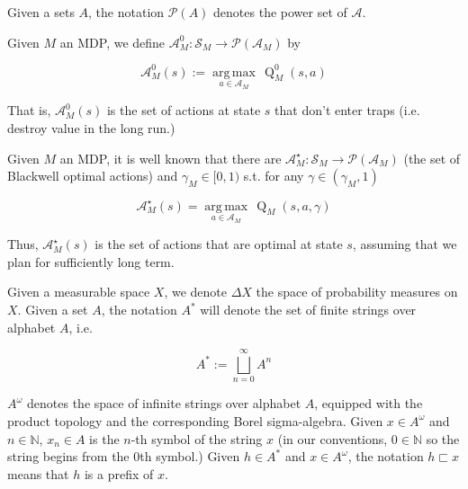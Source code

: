\documentclass[anon,12pt]{colt2018} %
\newcommand{\AP}[1]{\left(#1\right)}
\newcommand{\PS}[1]{\mathcal{P}\AP{#1}}
\newcommand{\Argmax}[1]{\underset{#1}{\operatorname{arg\,max}}\,}
\newcommand{\Nats}{\mathbb{N}}
\newcommand{\A}{\mathcal{A}}
\newcommand{\St}{\mathcal{S}}
\newcommand{\Q}{\operatorname{Q}}
\begin{document}
Given a sets $A$, the notation $\PS{A}$ denotes the power set of $\A$.

\begin{samepage}
\begin{definition}

Given $M$ an MDP, we define $\A_M^0: \St_M \rightarrow \PS{\A_M}$ by

\begin{equation}
\A_M^0(s) := \Argmax{a \in \A_M} \Q_M^0(s,a)
\end{equation}

That is, $\A_M^0(s)$ is the set of actions at state $s$ that don't enter traps (i.e. destroy value in the long run.)

\end{definition}
\end{samepage}

\begin{samepage}
\begin{definition}

Given $M$ an MDP, it is well known that there are $\A_M^\star: \St_M \rightarrow \PS{\A_M}$ (the set of Blackwell optimal actions) and $\gamma_M\in[0,1)$ s.t. for any $\gamma\in\AP{\gamma_M,1}$

\begin{equation}
\A_M^\star(s) = \Argmax{a \in \A_M} \Q_M\AP{s,a,\gamma}
\end{equation}

Thus, $\A_M^\star(s)$ is the set of actions that are optimal at state $s$, assuming that we plan for sufficiently long term.

\end{definition}
\end{samepage}

Given a measurable space $X$, we denote $\Delta X$ the space of probability measures on $X$. 
Given a set $A$, the notation $A^*$ will denote the set of finite strings over alphabet $A$, i.e.

\[A^* := \bigsqcup_{n = 0}^\infty A^n\]

$A^\omega$ denotes the space of infinite strings over alphabet $A$, equipped with the product topology and the corresponding Borel sigma-algebra. Given $x\in A^\omega$ and $n \in \Nats$, $x_n \in A$ is the $n$-th symbol of the string $x$ (in our conventions, $0 \in \Nats$ so the string begins from the 0th symbol.) Given $h \in A^*$ and $x \in A^\omega$, the notation $h \sqsubset x$ means that $h$ is a prefix of $x$.
\end{document}

